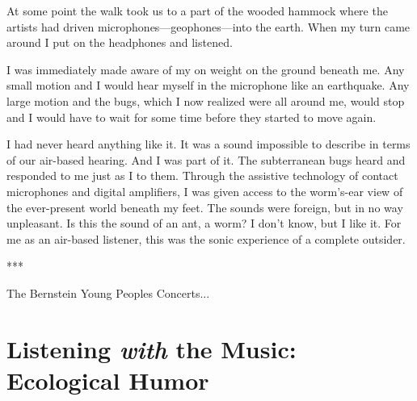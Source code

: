 \documentclass[12pt,letterpaper]{article}
\begin{document}
	At some point the walk took us to a part of the wooded hammock where 
	the artists had driven microphones---geophones---into the earth. When 
	my turn came around I put on the headphones and listened. 

	I was immediately made aware of my on weight on the ground beneath me. 
	Any small motion and I would hear myself in the microphone like an 
	earthquake. Any large motion and the bugs, which I now realized were all
	around me, would stop and I would have to wait for some time before they
	started to move again. 

	I had never heard anything like it. It was a sound impossible to 
	describe in terms of our air-based hearing. And I was part of it. The 
	subterranean bugs heard and responded to me just as I to them. Through 
	the assistive technology of contact microphones and digital amplifiers, 
	I was given access to the worm's-ear view of the ever-present world 
	beneath my feet. The sounds were foreign, but in no way unpleasant. Is 
	this the sound of an ant, a worm? I don't know, but I like it. For me as
	an air-based listener, this was the sonic experience of a complete outsider.	
	
	\bigskip

	\begin{center}
	***
	\end{center}

	\noindent The Bernstein Young Peoples Concerts...
	
	\newpage
	\section*{Listening \textit{with} the Music: Ecological Humor} 

	
\newpage
\printbibliography
\end{document}
